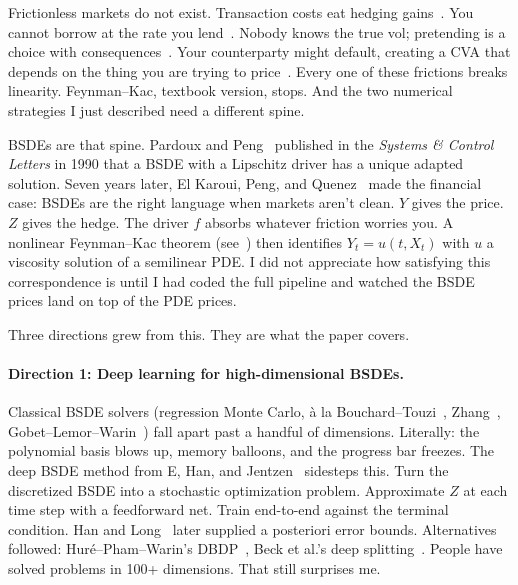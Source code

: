 \documentclass[11pt]{article}
\theoremstyle{definition}
\theoremstyle{remark}
\begin{document}
Frictionless markets do not exist.
Transaction costs eat hedging
gains~\cite{leland1985option}.
You cannot borrow at the rate you
lend~\cite{bergman1995option}.
Nobody knows the true vol; pretending
is a choice with consequences~\cite{avellaneda1995pricing}.
Your counterparty might default, creating a CVA that depends on the
thing you are trying to price~\cite{bichuch2018xva,crepey2014counterparty}.
Every one of these frictions breaks linearity.
Feynman--Kac, textbook version, stops.
And the two numerical strategies I just described need a different spine.

BSDEs are that spine. Pardoux and Peng~\cite{pardoux1990adapted}
published in the \emph{Systems \& Control Letters} in 1990 that a
BSDE with a Lipschitz driver has a unique adapted solution. Seven
years later, El Karoui, Peng, and
Quenez~\cite{elkaroui1997backward} made the financial case:
BSDEs are the right language when markets aren't clean.
$Y$ gives the price.
$Z$ gives the hedge.
The driver $f$ absorbs whatever friction worries you.
A nonlinear Feynman--Kac theorem
(see~\cite{pardoux1990adapted,zhang2017backward}) then identifies
$Y_t = u(t, X_t)$ with $u$ a viscosity solution of a semilinear PDE.
I did not appreciate how satisfying this correspondence is until I had
coded the full pipeline and watched the BSDE prices land on top of the
PDE prices.

Three directions grew from this. They are what the paper covers.

\paragraph{Direction 1: Deep learning for high-dimensional BSDEs.}
Classical BSDE solvers (regression Monte Carlo, \`a la
Bouchard--Touzi~\cite{bouchard2004discrete},
Zhang~\cite{zhang2004numerical},
Gobet--Lemor--Warin~\cite{gobet2005regression}) fall apart past a
handful of dimensions. Literally: the polynomial basis blows up,
memory balloons, and the progress bar freezes. The deep BSDE method
from E, Han, and Jentzen~\cite{ehan2017deep,han2018solving}
sidesteps this. Turn the discretized BSDE into a stochastic
optimization problem. Approximate $Z$ at each time step with a
feedforward net. Train end-to-end against the terminal condition.
Han and Long~\cite{hanlong2020convergence} later supplied a
posteriori error bounds. Alternatives followed:
Hur\'{e}--Pham--Warin's DBDP~\cite{hure2020deep}, Beck et
al.'s deep splitting~\cite{beck2021deep}. People have solved
problems in 100+ dimensions. That still surprises me.
\end{document}
